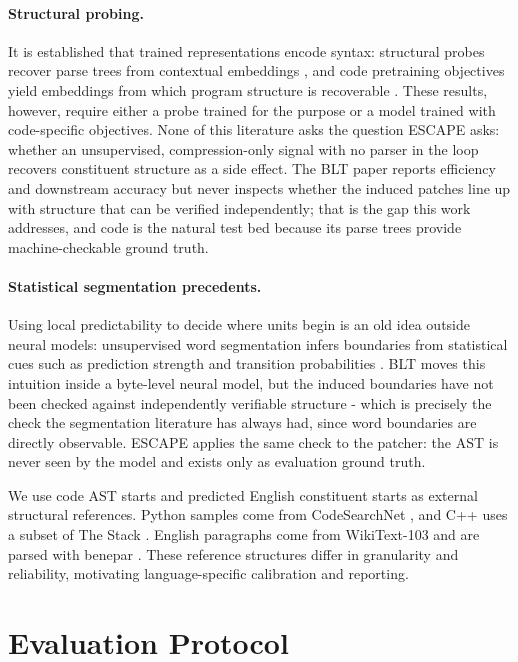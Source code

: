 \paragraph{Structural probing.}
It is established that trained representations encode syntax: structural probes recover parse trees from contextual embeddings \citep{hewitt-manning-2019-structural}, and code pretraining objectives yield embeddings from which program structure is recoverable \citep{feng-etal-2020-codebert}. These results, however, require either a probe trained for the purpose or a model trained with code-specific objectives. None of this literature asks the question ESCAPE asks: whether an unsupervised, compression-only signal with no parser in the loop recovers constituent structure as a side effect. The BLT paper reports efficiency and downstream accuracy but never inspects whether the induced patches line up with structure that can be verified independently; that is the gap this work addresses, and code is the natural test bed because its parse trees provide machine-checkable ground truth.

\paragraph{Statistical segmentation precedents.}
Using local predictability to decide where units begin is an old idea outside neural models: unsupervised word segmentation infers boundaries from statistical cues such as prediction strength and transition probabilities \citep{brent1999segmentation, goldwater2009word}. BLT moves this intuition inside a byte-level neural model, but the induced boundaries have not been checked against independently verifiable structure - which is precisely the check the segmentation literature has always had, since word boundaries are directly observable. ESCAPE applies the same check to the patcher: the AST is never seen by the model and exists only as evaluation ground truth.

We use code AST starts and predicted English constituent starts as external structural references. Python samples come from CodeSearchNet \citep{husain2019codesearchnet}, and C++ uses a subset of The Stack \citep{kocetkov2022stack}. English paragraphs come from WikiText-103 \citep{merity2017pointer} and are parsed with benepar \citep{kitaev-klein-2018-constituency}. These reference structures differ in granularity and reliability, motivating language-specific calibration and reporting.

\section{Evaluation Protocol}
\label{sec:protocol}
